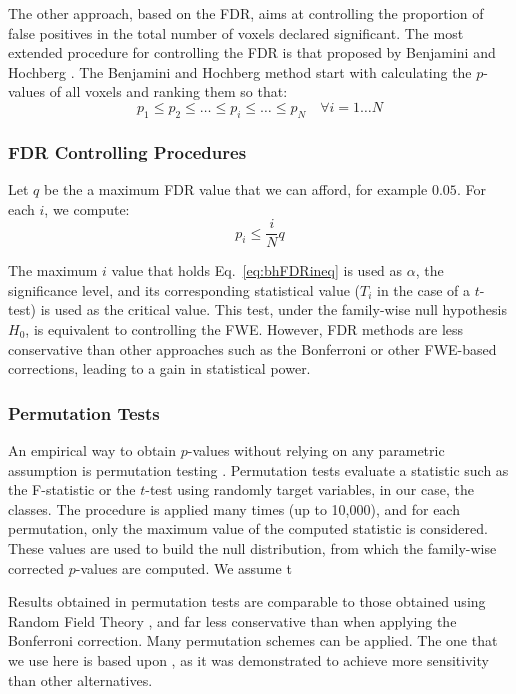 The other approach, based on the \ac{FDR}, aims at controlling the proportion of false positives in the total number of voxels declared significant. The most extended procedure for controlling the \ac{FDR} is that proposed by Benjamini and Hochberg \cite{Benjamini1995}. The Benjamini and Hochberg method start with calculating the $p$-values of all voxels and ranking them so that:
\begin{equation}
p_1 \leq p_2 \leq \dots \leq p_i \leq \dots \leq p_N \quad \forall i=1\dots N
\end{equation}

\subsubsection{FDR Controlling Procedures}
Let $q$ be the a maximum \ac{FDR} value that we can afford, for example $0.05$. For each $i$, we compute:
\begin{equation}\label{eq:bhFDRineq}
p_i \leq \frac{i}{N}q
\end{equation}

The maximum $i$ value that holds Eq.~\ref{eq:bhFDRineq} is used as $\alpha$, the significance level, and its corresponding statistical value ($T_i$ in the case of a $t$-test) is used as the critical value. This test, under the family-wise null hypothesis $H_0$, is equivalent to controlling the \ac{FWE}. However, \ac{FDR} methods are less conservative than other approaches such as the Bonferroni or other \ac{FWE}-based corrections, leading to a gain in statistical power. 


\subsubsection{Permutation Tests}
An empirical way to obtain $p$-values without relying on any parametric assumption is permutation testing \cite{Anderson2001,Winkler2014}. Permutation tests evaluate a statistic such as the F-statistic or the $t$-test using randomly target variables, in our case, the classes. The procedure is applied many times (up to 10,000), and for each permutation, only the maximum value of the computed statistic is considered. These values are used to build the null distribution, from which the family-wise corrected $p$-values are computed. We assume t

Results obtained in permutation tests are comparable to those obtained using Random Field Theory \cite{Winkler2014}, and far less conservative than when applying the Bonferroni correction. Many permutation schemes can be applied. The one that we use here is based upon \cite{Anderson2001}, as it was demonstrated to achieve more sensitivity than other alternatives. 


